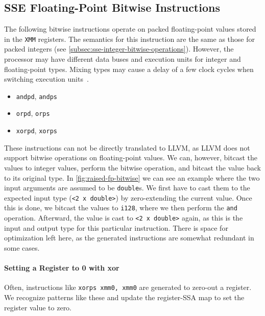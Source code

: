 \subsection{SSE Floating-Point Bitwise Instructions}\label{subsec:sse-floating-point-bitwise-instructions}

The following bitwise instructions operate on packed floating-point values stored in the \texttt{XMM} registers.
The semantics for this instruction are the same as those for packed integers (see \cref{subsec:sse-integer-bitwise-operations}).
However, the processor may have different data buses and execution units for integer and floating-point types.
Mixing types may cause a delay of a few clock cycles when switching execution units~\parencite[p.~119]{optimiziation_x86}.

\begin{itemize}
    \item \texttt{andpd}, \texttt{andps}
    \item \texttt{orpd}, \texttt{orps}
    \item \texttt{xorpd}, \texttt{xorps}
\end{itemize}

These instructions can not be directly translated to LLVM, as LLVM does not support bitwise operations on floating-point values.
We can, however, bitcast the values to integer values, perform the bitwise operation, and bitcast the value back to its original type.
In \cref{fig:raised-fp-bitwise} we can see an example where the two input arguments are assumed to be \texttt{double}s.
We first have to cast them to the expected input type (\texttt{<2 x double>}) by zero-extending the current value.
Once this is done, we bitcast the values to \texttt{i128}, where we then perform the \texttt{and} operation.
Afterward, the value is cast to \texttt{<2 x double>} again, as this is the input and output type for this particular instruction.
There is space for optimization left here, as the generated instructions are somewhat redundant in some cases.

\paragraph{Setting a Register to 0 with xor} Often, instructions like \texttt{xorps xmm0, xmm0} are generated to zero-out a register.
We recognize patterns like these and update the register-SSA map to set the register value to zero.

